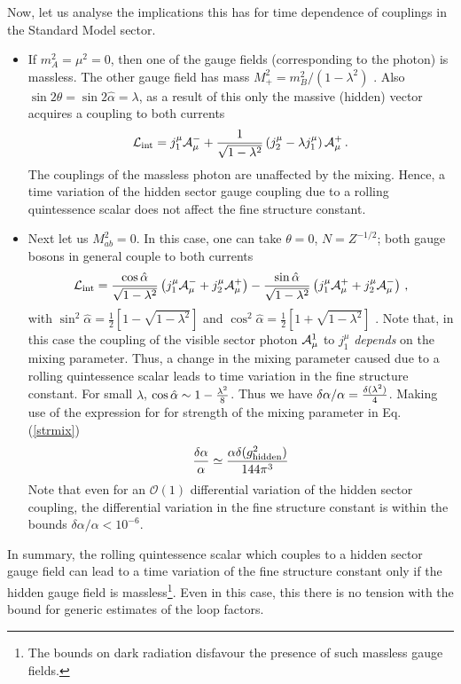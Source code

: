 \documentclass[11pt,a4paper]{article}
\newcommand{\halpha}{\hat{\alpha}}
\newcommand{\be}{\begin{equation}}
\newcommand{\ee}{\end{equation}}
\def\pref#1{(\ref{#1})}
\newcommand{\ma}{m_{\scriptscriptstyle A}}
\newcommand{\mb}{m_{\scriptscriptstyle B}}
\begin{document}
Now, let us analyse the implications this has for time dependence of couplings in the Standard Model sector. 


\begin{itemize}

\item If $\ma^2 = \mu^2 = 0$, then one of the gauge fields  (corresponding to the photon) is
massless. The other gauge field has mass $M_+^2 =
\mb^2/(1-\lambda^2)$ . Also $\sin 2\theta = \sin 2\halpha = \lambda$, as a result of this only the massive (hidden) vector acquires a coupling to both currents
%
\be \label{eq:masslessmassivemixing}
    {\cal L}_{\rm int} = j_1^\mu {\cal
    A}^-_\mu + \frac{1}{\sqrt{1-\lambda^2}}
    \left( j_2^\mu - \lambda
    j_1^\mu \right) {\cal A}^+_\mu \,.
\ee
%
The couplings of the massless photon are unaffected by the mixing. Hence, a time variation of the hidden sector gauge coupling due to a rolling quintessence scalar does not affect the fine structure constant.


\item Next let us  $M^2_{ab} = 0$. In this case,  one can take $\theta = 0$,  $N = Z^{-1/2}$;
both gauge bosons in general couple to both currents
%
\be\label{eq:masslessBoson}
    {\cal L}_{\rm int} = \frac{\cos\halpha}{\sqrt{1-\lambda^2}}
    \left( j_1^\mu {\cal A}^-_\mu
    + j_2^\mu {\cal A}^+_\mu \right)
    - \frac{\sin\halpha}{\sqrt{1-\lambda^2}}
    \left( j_1^\mu {\cal A}^+_\mu
    + j_2^\mu {\cal A}^-_\mu \right) \,,
\ee
%
with $\sin^2\halpha = \frac12 \left[ 1 - \sqrt{1-\lambda^2}
\right]$ and $\cos^2\halpha = \frac12 \left[ 1 + \sqrt{1 -
\lambda^2} \right]$ .
%
Note that, in this case the coupling of the visible sector photon ${\cal{A}}_{\mu}^{1}$  to $j^{\mu}_1$ {\it depends} on the 
mixing parameter. Thus, a change in the mixing parameter caused due to a rolling quintessence scalar leads to time variation in the fine structure constant. For small $\lambda$, $\cos \halpha \sim 1 - {\lambda^2 \over 8}$. Thus we have $ { \delta \alpha / \alpha} =  {\delta(\lambda^2) \over 4}$. Making use of the expression for for strength of the mixing parameter in Eq. \pref{strmix} 
%
$$
  { \delta \alpha \over \alpha} \simeq  {\alpha \delta( g^2_{\rm hidden} ) \over  144 \pi^3}
$$
%
Note that even for an ${\mathcal{O}}(1)$ differential variation of the hidden sector coupling, the differential variation in the fine structure constant is within the bounds ${\delta \alpha / \alpha} <  10^{-6} $.
\end{itemize}

In summary, the rolling quintessence scalar which couples to a hidden sector gauge field can lead to a time variation of the fine structure constant only if the hidden gauge field is massless\footnote{The bounds on dark radiation disfavour the presence of such massless gauge fields.}. Even in this case, this there is no tension with the 
bound for generic estimates of the loop factors.
\end{document}

